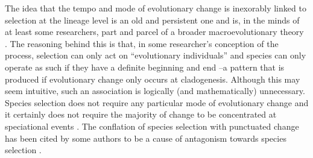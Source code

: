 The idea that the tempo and mode of evolutionary change is inexorably linked to selection at the lineage level is an old and persistent one and is, in the minds of at least some researchers, part and parcel of a broader macroevolutionary theory \citep{Stanley1975, Stanley1979, GouldEldredge1977, Gould1980, Charlesworth1982, Dennett1995, Levinton2001, Gould2002}. The reasoning behind this is that, in some researcher's conception of the process, selection can only act on ``evolutionary individuals'' \citep{Hull1980} and species can only operate as such if they have a definite beginning and end \citep{GouldEldredge1977, Gould2002}--a pattern that is produced if evolutionary change only occurs at cladogenesis. Although this may seem intuitive, such an association is logically (and mathematically) unnecessary. Species selection does not require any particular mode of evolutionary change and it certainly does not require the majority of change to be concentrated at speciational events \citep{VanValen1975, Bookstein1978, Slatkin1981, ArnoldFristrup1982, Rice1995, McShea2004, Rice2004, Okasha2006, Jablonski2008, Simpson2013}. The conflation of species selection with punctuated change has been cited by some authors to be a cause of antagonism towards species selection \citep{Turner2010, FitzJohnthesis}.


